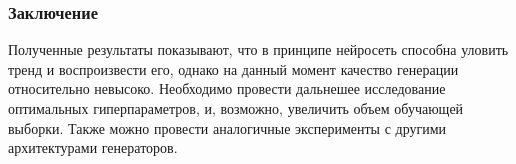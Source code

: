 \documentclass[9pt]{beamer}
\begin{document}
\begin{frame}\frametitle{Заключение}
	Полученные результаты показывают, что в принципе нейросеть способна уловить тренд и воспроизвести его, однако на данный момент качество генерации относительно невысоко. Необходимо провести дальнешее исследование оптимальных гиперпараметров, и, возможно, увеличить объем обучающей выборки. Также можно провести аналогичные эксперименты с другими архитектурами генераторов.
\end{frame}
\end{document}
